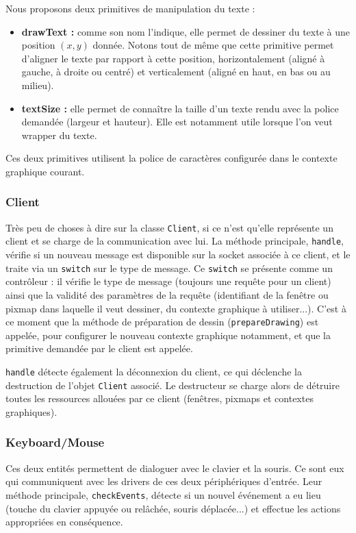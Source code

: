 Nous proposons deux primitives de manipulation du texte :
\begin{itemize}
  \item \textbf{drawText :} comme son nom l'indique, elle permet de dessiner du texte à une position $(x, y)$ donnée. Notons tout de même que cette primitive permet d'aligner le texte par rapport à cette position, horizontalement (aligné à gauche, à droite ou centré) et verticalement (aligné en haut, en bas ou au milieu).
  \item \textbf{textSize :} elle permet de connaître la taille d'un texte rendu avec la police demandée (largeur et hauteur). Elle est notamment utile lorsque l'on veut wrapper du texte.
\end{itemize}

\vspace{1em}

Ces deux primitives utilisent la police de caractères configurée dans le contexte graphique courant.

\subsubsection{Client}
Très peu de choses à dire sur la classe \verb|Client|, si ce n'est qu'elle représente un client et se charge de la communication avec lui. La méthode principale, \verb|handle|, vérifie si un nouveau message est disponible sur la socket associée à ce client, et le traite via un \verb|switch| sur le type de message. Ce \verb|switch| se présente comme un contrôleur : il vérifie le type de message (toujours une requête pour un client) ainsi que la validité des paramètres de la requête (identifiant de la fenêtre ou pixmap dans laquelle il veut dessiner, du contexte graphique à utiliser...). C'est à ce moment que la méthode de préparation de dessin (\verb|prepareDrawing|) est appelée, pour configurer le nouveau contexte graphique notamment, et que la primitive demandée par le client est appelée.

\verb|handle| détecte également la déconnexion du client, ce qui déclenche la destruction de l'objet \verb|Client| associé. Le destructeur se charge alors de détruire toutes les ressources allouées par ce client (fenêtres, pixmaps et contextes graphiques).

\subsubsection{Keyboard/Mouse}

Ces deux entités permettent de dialoguer avec le clavier et la souris. Ce sont eux qui communiquent avec les drivers de ces deux périphériques d'entrée. Leur méthode principale, \verb|checkEvents|, détecte si un nouvel événement a eu lieu (touche du clavier appuyée ou relâchée, souris déplacée...) et effectue les actions appropriées en conséquence.

